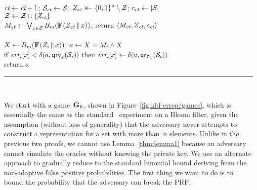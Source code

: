 \begin{figure*}
{    $\textit{ct} \gets \textit{ct}+1$;
    $\mathcal{S}_{\textit{ct}} \gets \mathcal{S}$;
    $Z_{\textit{ct}} \mathrel{\leftarrow\mkern-14mu\leftarrow} \{0,1\}^\lambda \setminus \mathcal{Z}$;
    $c_{\textit{ct}} \gets |\mathcal{S}|$\\
    $\mathcal{Z} \gets \mathcal{Z} \cup \{Z_{\textit{ct}}\}$\\
    $M_{\textit{ct}} \gets \bigvee_{x \in \mathcal{S}} {B}_m(\textup{\textbf{F}}\hspace{0.5pt}(Z_{\textit{ct}} \, \| \, x))$;
    return $\langle M_{\textit{ct}}, Z_{\textit{ct}}, c_{\textit{ct}} \rangle$
  \\[6pt]
  \\[2pt]
    $X \gets {B}_m(\textup{\textbf{F}}\hspace{0.5pt}(Z_i \, \| \, x))$;
    $a \gets X = M_i \wedge X$\\
    if $\textit{err}_i[x] < \delta(a,\mathsf{qry}_x(\mathcal{S}_i))$ then
          $\textit{err}_i[x] \gets \delta(a,\mathsf{qry}_x(\mathcal{S}_i))$\\
    return $a$
  \\[4pt]
  \hrule
  \vspace{2pt}
  \hfill{}\\[2pt]
}
\caption{Games 0--4 for proof of Theorem~\ref{thm:bf-key-bound}.}
\label{fig:kbf-errep/games}
\end{figure*}

We start with a game~$\textup{\textbf{G}}\hspace{0.5pt}_0$, shown in Figure~\ref{fig:kbf-errep/games}, which is essentially the same as the standard
\errep\ experiment on a Bloom filter, given the assumption (without loss of
generality) that the adversary never attempts to construct a representation for
a set with more than~$n$ elements.
%
%
Unlike in the previous two proofs, we cannot use Lemma~\ref{thm:lemma1} because
an adversary cannot simulate the oracles without knowing the private key. We use
an alternate approach to gradually reduce to the standard binomial bound
deriving from the non-adaptive false positive probabilities. The first thing we
want to do is to bound the probability that the adversary can break the PRF.

